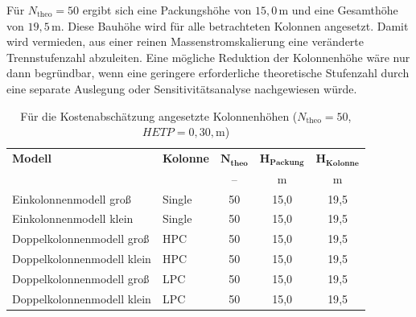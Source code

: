 Für \(N_{\text{theo}}=50\) ergibt sich eine Packungshöhe von
\(15{,}0\,\mathrm{m}\) und eine Gesamthöhe von \(19{,}5\,\mathrm{m}\). Diese
Bauhöhe wird für alle betrachteten Kolonnen angesetzt. Damit wird vermieden,
aus einer reinen Massenstromskalierung eine veränderte Trennstufenzahl
abzuleiten. Eine mögliche Reduktion der Kolonnenhöhe wäre nur dann
begründbar, wenn eine geringere erforderliche theoretische Stufenzahl durch
eine separate Auslegung oder Sensitivitätsanalyse nachgewiesen würde.

\begin{table}[H]
\centering
\caption{Für die Kostenabschätzung angesetzte Kolonnenhöhen
(\(N_{\text{theo}}=50\), \(HETP=0{,}30,\mathrm{m}\))}
\label{tab:kolonnenhoehen_packung}
\small
\begin{tabular}{llccc}
\hline
\textbf{Modell} & \textbf{Kolonne} &
\(\boldsymbol{N_{\text{theo}}}\) &
\(\boldsymbol{H_{\text{Packung}}}\) &
\(\boldsymbol{H_{\text{Kolonne}}}\) \\
& & -- & m & m \\
\hline
Einkolonnenmodell groß & Single & 50 & 15{,}0 & 19{,}5 \\
Einkolonnenmodell klein & Single & 50 & 15{,}0 & 19{,}5 \\
Doppelkolonnenmodell groß & HPC & 50 & 15{,}0 & 19{,}5 \\
Doppelkolonnenmodell klein & HPC & 50 & 15{,}0 & 19{,}5 \\
Doppelkolonnenmodell groß & LPC & 50 & 15{,}0 & 19{,}5 \\
Doppelkolonnenmodell klein & LPC & 50 & 15{,}0 & 19{,}5 \\
\hline
\end{tabular}
\end{table}

